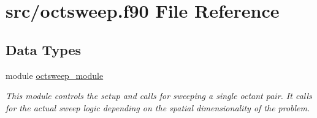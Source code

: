 \hypertarget{octsweep_8f90}{\section{src/octsweep.f90 File Reference}
\label{octsweep_8f90}
}
\subsection*{Data Types}
\begin{DoxyCompactItemize}
\item 
module \hyperlink{classoctsweep__module}{octsweep\-\_\-module}
\begin{DoxyCompactList}\small\item\em This module controls the setup and calls for sweeping a single octant pair. It calls for the actual sweep logic depending on the spatial dimensionality of the problem. \end{DoxyCompactList}\end{DoxyCompactItemize}
